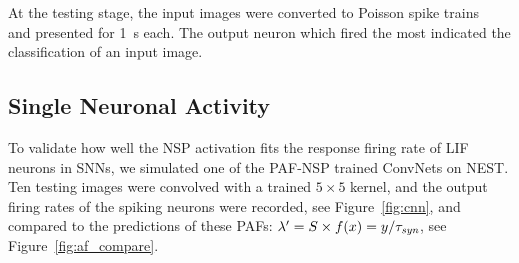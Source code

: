 	At the testing stage, the input images were converted to Poisson spike trains~\citep{liu2016bench} and presented for 1~s each.
	The output neuron which fired the most indicated the classification of an input image.
%	
%	

	
	\subsection{Single Neuronal Activity}
	\label{subsec:compareAF}
	To validate how well the NSP activation fits the response firing rate of LIF neurons in SNNs, we simulated one of the PAF-NSP trained ConvNets on NEST.
	Ten testing images were convolved with a trained $5\times5$ kernel, and the output firing rates of the spiking neurons were recorded, see Figure~\ref{fig:cnn}, and compared to the predictions of these PAFs: $\lambda' = S \times f(x) = y/\tau_{\textit{\textrm{syn}}}$, see Figure~\ref{fig:af_compare}.

